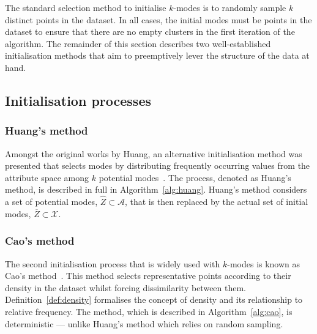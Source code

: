 

The standard selection method to initialise \(k\)-modes is to randomly sample
\(k\) distinct points in the dataset. In all cases, the initial modes must be
points in the dataset to ensure that there are no empty clusters in the first
iteration of the algorithm. The remainder of this section describes two
well-established initialisation methods that aim to preemptively lever the
structure of the data at hand.


\subsection{Initialisation processes}\label{subsec:inits}

\subsubsection{Huang's method}\label{subsec:huang}

Amongst the original works by Huang, an alternative initialisation method was
presented that selects modes by distributing frequently occurring values from the
attribute space among \(k\) potential modes~\cite{Huang1998}. The process,
denoted as Huang's method, is described in full in Algorithm~\ref{alg:huang}.
Huang's method considers a set of potential modes,
\(\widehat Z \subset \mathcal A\), that is then replaced by the actual set of
initial modes, \(\overline Z \subset \mathcal X\).



%


\subsubsection{Cao's method}\label{subsec:cao}

The second initialisation process that is widely used with \(k\)-modes is known
as Cao's method~\cite{Cao2009}. This method selects representative points
according to their density in the dataset whilst forcing dissimilarity between
them. Definition~\ref{def:density} formalises the concept of density and its
relationship to relative frequency. The method, which is described in
Algorithm~\ref{alg:cao}, is deterministic --- unlike Huang's method which relies
on random sampling.

